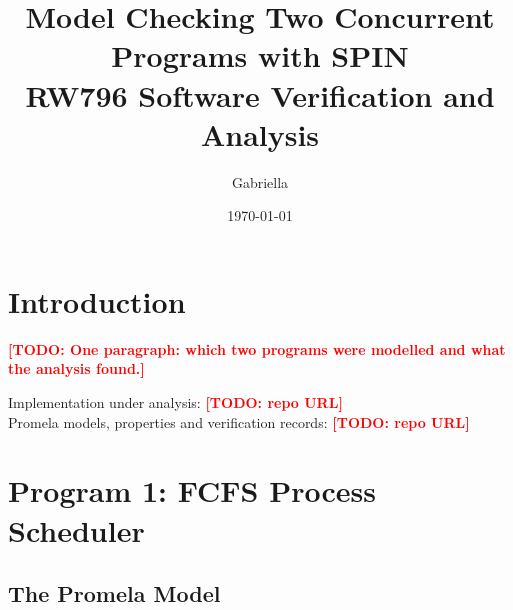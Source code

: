 \documentclass[11pt,a4paper]{article}
\title{Model Checking Two Concurrent Programs with SPIN\\
       \large RW796 Software Verification and Analysis}
\author{Gabriella \todo{surname} \\ \todo{student number}}
\date{\today}
\newcommand{\todo}[1]{\textcolor{red}{\textbf{[TODO: #1]}}}
\begin{document}
\maketitle

\section*{Introduction}

\todo{One paragraph: which two programs were modelled and what the
analysis found.}

Implementation under analysis: \todo{repo URL}\\
Promela models, properties and verification records: \todo{repo URL}

\section{Program 1: FCFS Process Scheduler}

\subsection{The Promela Model}
\end{document}
